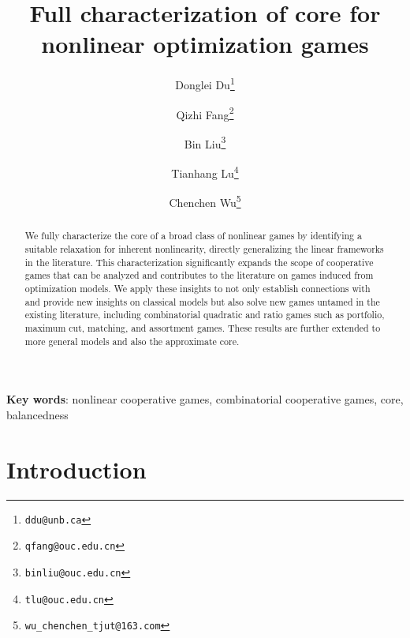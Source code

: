 \documentclass[11pt]{article}\usepackage[]{graphicx}\usepackage[]{xcolor}
\begin{document}
\title{Full characterization of core for nonlinear optimization games}
\author[1]{Donglei Du\thanks{\tt ddu@unb.ca}}
\author[2]{Qizhi Fang\thanks{\tt qfang@ouc.edu.cn}}
\author[2]{Bin Liu\thanks{\tt binliu@ouc.edu.cn}}
\author[2]{Tianhang Lu\thanks{\tt tlu@ouc.edu.cn}}
\author[3]{Chenchen Wu\thanks{\tt wu\_chenchen\_tjut@163.com}}



\maketitle

\begin{abstract}
We fully characterize the core of a broad class of nonlinear games by identifying a suitable relaxation for inherent nonlinearity, directly generalizing the linear frameworks in the literature. This characterization significantly expands the scope of cooperative games that can be analyzed and contributes to the literature on games induced from optimization models. We apply these insights to not only establish connections with and provide new insights on classical models but also solve new games untamed in the existing literature, including combinatorial quadratic and ratio games such as portfolio, maximum cut, matching, and assortment games. These results are further extended to more general models and also the approximate core. 
\end{abstract}


\textbf{Key words}: nonlinear cooperative games, combinatorial cooperative games, core, balancedness

\tableofcontents
\section{Introduction}\label{sec:intro}
\end{document}
